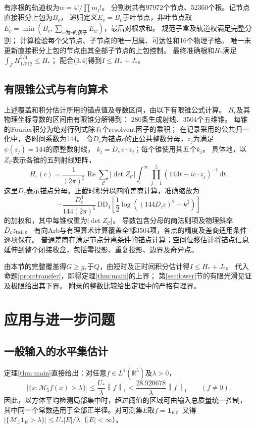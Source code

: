 \documentclass[UTF8,fontset=fandol,zihao=-4,a4paper]{ctexart}
\newcommand{\R}{\mathbb R}
\newcommand{\1}{\mathbf 1}
\newcommand{\dd}{\,\mathrm d}
\newcommand{\norm}[1]{\left\lVert#1\right\rVert}
\begin{document}
有序根的轨道权为$w=4!/\prod m_j!$。
分割树共有97972个节点、52360个根。记节点直接积分上包为$B_v$，
递归定义$E_v=B_v$于叶节点，非叶节点取
$E_v=\min(B_v,\sum_{w\text{为}v\text{的孩子}}E_w)$，最后对根求和。
规范子盒及轨道权满足完整分割；
计算检验每个父节点、子节点的唯一归属、可达性和16个物理子格。
唯一未更新直接积分上包的节点由其全部子节点的上包控制。
最终准确根和$H_*$满足$\int_FH_{1/512}^{5/4}\le H_*$；
配合(3.4)得到$I\le H_*+J_*$。

\subsection{有限锥公式与有向算术}
上述覆盖和积分估计所用的锚点值及导数区间，由以下有限锥公式计算。
$H_\epsilon$及其物理坐标导数的区间由有限锥分解得到：
280条生成射线、3504个五维锥。
每锥的Fourier积分为绝对行列式除五个resolvent因子的乘积；
在记录采用的公共归一化中，各时间系数为144。
令$D_c$为锚点$c$的正公共整数分母，$z_j$为满足$\psi(z_j)=144$的原整数射线，
$k_j=D_c\,c\cdot z_j$；每个锥使用其五个$k_j$。
具体地，以$Z_{\mathcal C}$表示各锥的五列射线矩阵，
\[
 H_\epsilon(c)=\frac1{(2\pi)^5}\operatorname{Re}
 \sum_{\mathcal C}|\det Z_{\mathcal C}|
 \int_\epsilon^\infty\prod_{j=1}^5(144t-i c\cdot z_j)^{-1}\dd t.
\]
这里$D_c$表示锚点分母。正截时积分以四阶差商计算，准确缩放为
\[ -\frac{D_c^4}{144(2\pi)^5}\,\mathrm{DD}_4\!\left[\frac12\log((144D_c\epsilon)^2+k^2)\right] \]
的加权和，其中每锥权重为$|\det Z_{\mathcal C}|$。
导数包含分母的商法则项及物理斜率$D_cz_{\rm tail}$。
有向Arb与有理算术计算覆盖全部3504项，各点的精度及差商适用条件逐项保存。
普通差商在满足节点分离条件的锚点计算；空间位移估计将锚点信息延伸到整个闭接收盒，包括零投影、重复投影、边界及奇异点。


由本节的完整覆盖得$G\ge g_*$于$Q$，由短时及正时间积分估计得$I\le H_*+J_*$。
代入命题\ref{prop:transfer}，即得定理\ref{thm:main}的上界；
第\ref{sec:lower}节的有限光滑见证及极限给出其下界。
附录的整数比较给出定理中的严格有理界。

\section{应用与进一步问题}
\subsection{一般输入的水平集估计}
定理\ref{thm:main}直接给出：对任意$f\in L^1(\R^5)$及$\lambda>0$，
\[
 |\{x:\mathcal M_5f(x)>\lambda\}|
 \le \frac{U_*}{\lambda}\norm f_1
 <\frac{28.920678}{\lambda}\norm f_1\qquad(f\ne0).
\]
因此，以方体平均检测局部集中时，超过阈值的区域可由输入总质量统一控制，
其中同一个常数适用于全部正半径。对可测集$E$取$f=\1_E$，又得
$|\{\mathcal M_5\1_E>\lambda\}|\le U_*|E|/\lambda$（$|E|<\infty$）。
\end{document}
